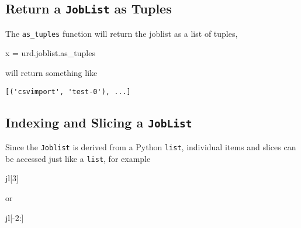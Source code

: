 \subsection{Return a \texttt{JobList} as Tuples}
The \texttt{as\_tuples} function will return the joblist as a list of
tuples,
\begin{python}
x = urd.joblist.as_tuples
\end{python}
will return something like
\begin{verbatim}
[('csvimport', 'test-0'), ...]
\end{verbatim}


\subsection{Indexing and Slicing a \texttt{JobList}}
Since the \texttt{Joblist} is derived from a Python \texttt{list},
individual items and slices can be accessed just like a \texttt{list},
for example
\begin{python}
jl[3]
\end{python}
or
\begin{python}
jl[-2:]
\end{python}








